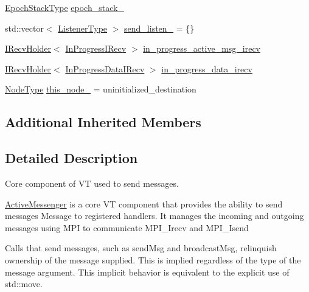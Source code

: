 \begin{DoxyCompactItemize}
\item 
\hyperlink{structvt_1_1messaging_1_1_active_messenger_a746358029c37dabf2b4c8ad26642aee9}{Epoch\+Stack\+Type} \hyperlink{structvt_1_1messaging_1_1_active_messenger_a477f7599bd71cba2865e49f3610e6025}{epoch\+\_\+stack\+\_\+}
\item 
std\+::vector$<$ \hyperlink{structvt_1_1messaging_1_1_active_messenger_a63878fd4ef1fbc505bd1313d32049ca9}{Listener\+Type} $>$ \hyperlink{structvt_1_1messaging_1_1_active_messenger_a52779f8ed30e23442a802e42c3462a0b}{send\+\_\+listen\+\_\+} = \{\}
\item 
\hyperlink{structvt_1_1messaging_1_1_i_recv_holder}{I\+Recv\+Holder}$<$ \hyperlink{structvt_1_1messaging_1_1_in_progress_i_recv}{In\+Progress\+I\+Recv} $>$ \hyperlink{structvt_1_1messaging_1_1_active_messenger_aaa384d58565da05b8b3ac60c5ee68ee0}{in\+\_\+progress\+\_\+active\+\_\+msg\+\_\+irecv}
\item 
\hyperlink{structvt_1_1messaging_1_1_i_recv_holder}{I\+Recv\+Holder}$<$ \hyperlink{structvt_1_1messaging_1_1_in_progress_data_i_recv}{In\+Progress\+Data\+I\+Recv} $>$ \hyperlink{structvt_1_1messaging_1_1_active_messenger_aabf031983b435e4cf20d16dd561f179d}{in\+\_\+progress\+\_\+data\+\_\+irecv}
\item 
\hyperlink{namespacevt_a866da9d0efc19c0a1ce79e9e492f47e2}{Node\+Type} \hyperlink{structvt_1_1messaging_1_1_active_messenger_a44428f493f635833b6b8da6a6dfcf08f}{this\+\_\+node\+\_\+} = uninitialized\+\_\+destination
\end{DoxyCompactItemize}
\subsection*{Additional Inherited Members}


\subsection{Detailed Description}
Core component of VT used to send messages. 

\hyperlink{structvt_1_1messaging_1_1_active_messenger}{Active\+Messenger} is a core VT component that provides the ability to send messages {\ttfamily Message} to registered handlers. It manages the incoming and outgoing messages using M\+PI to communicate {\ttfamily M\+P\+I\+\_\+\+Irecv} and {\ttfamily M\+P\+I\+\_\+\+Isend} 

Calls that send messages, such as {\ttfamily send\+Msg} and {\ttfamily broadcast\+Msg}, relinquish ownership of the message supplied. This is implied regardless of the type of the message argument. This implicit behavior is equivalent to the explicit use of {\ttfamily std\+::move}.

